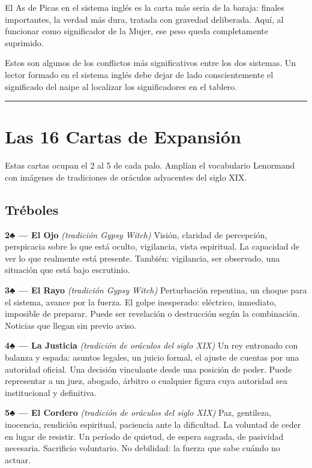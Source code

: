 El As de Picas en el sistema inglés es la carta más seria de la baraja: finales importantes, la verdad más dura, tratada con gravedad deliberada. Aquí, al funcionar como significador de la Mujer, ese peso queda completamente suprimido.

Estos son algunos de los conflictos más significativos entre los dos sistemas. Un lector formado en el sistema inglés debe dejar de lado conscientemente el significado del naipe al localizar los significadores en el tablero.

\begin{center}\rule{0.5\linewidth}{0.5pt}\end{center}

\section{Las 16 Cartas de Expansión}\label{the-16-expansion-cards}

Estas cartas ocupan el 2 al 5 de cada palo. Amplían el vocabulario Lenormand con imágenes de tradiciones de oráculos adyacentes del siglo XIX.

\subsection{Tréboles}\label{clubs}

\textbf{2♣ --- El Ojo} \emph{(tradición Gypsy Witch)} Visión, claridad de percepción, perspicacia sobre lo que está oculto, vigilancia, vista espiritual. La capacidad de ver lo que realmente está presente. También: vigilancia, ser observado, una situación que está bajo escrutinio.

\textbf{3♣ --- El Rayo} \emph{(tradición Gypsy Witch)} Perturbación repentina, un choque para el sistema, avance por la fuerza. El golpe inesperado: eléctrico, inmediato, imposible de preparar. Puede ser revelación o destrucción según la combinación. Noticias que llegan sin previo aviso.

\textbf{4♣ --- La Justicia} \emph{(tradición de oráculos del siglo XIX)} Un rey entronado con balanza y espada: asuntos legales, un juicio formal, el ajuste de cuentas por una autoridad oficial. Una decisión vinculante desde una posición de poder. Puede representar a un juez, abogado, árbitro o cualquier figura cuya autoridad sea institucional y definitiva.

\textbf{5♣ --- El Cordero} \emph{(tradición de oráculos del siglo XIX)} Paz, gentileza, inocencia, rendición espiritual, paciencia ante la dificultad. La voluntad de ceder en lugar de resistir. Un período de quietud, de espera sagrada, de pasividad necesaria. Sacrificio voluntario. No debilidad: la fuerza que sabe cuándo no actuar.

